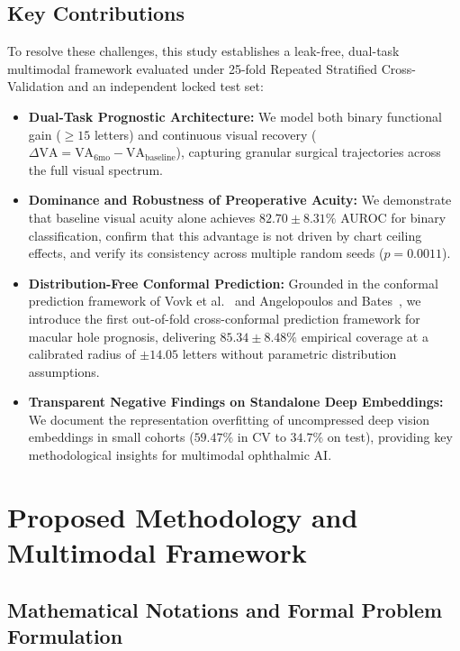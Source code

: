 \documentclass[preprint,12pt]{elsarticle}
\begin{document}
\subsection{Key Contributions}
To resolve these challenges, this study establishes a leak-free, dual-task multimodal framework evaluated under 25-fold Repeated Stratified Cross-Validation and an independent locked test set:
\begin{itemize}
    \item \textbf{Dual-Task Prognostic Architecture:} We model both binary functional gain ($\ge 15$ letters) and continuous visual recovery ($\Delta \text{VA} = \text{VA}_{6\text{mo}} - \text{VA}_{\text{baseline}}$), capturing granular surgical trajectories across the full visual spectrum.
    \item \textbf{Dominance and Robustness of Preoperative Acuity:} We demonstrate that baseline visual acuity alone achieves $82.70 \pm 8.31\%$ AUROC for binary classification, confirm that this advantage is not driven by chart ceiling effects, and verify its consistency across multiple random seeds ($p=0.0011$).
    \item \textbf{Distribution-Free Conformal Prediction:} Grounded in the conformal prediction framework of Vovk et al.~\cite{vovk2005} and Angelopoulos and Bates~\cite{angelopoulos2021}, we introduce the first out-of-fold cross-conformal prediction framework for macular hole prognosis, delivering $85.34 \pm 8.48\%$ empirical coverage at a calibrated radius of $\pm 14.05$ letters without parametric distribution assumptions.
    \item \textbf{Transparent Negative Findings on Standalone Deep Embeddings:} We document the representation overfitting of uncompressed deep vision embeddings in small cohorts ($59.47\%$ in CV to $34.7\%$ on test), providing key methodological insights for multimodal ophthalmic AI.
\end{itemize}

\section{Proposed Methodology and Multimodal Framework}
\label{sec:methodology}

\subsection{Mathematical Notations and Formal Problem Formulation}
\label{sec:notations_problem_formulation}
\end{document}

